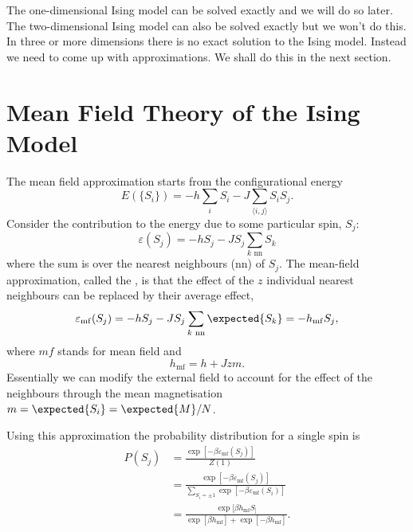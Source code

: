 \documentclass[fleqn]{NotesClass}
\begin{document}
    The one-dimensional Ising model can be solved exactly and we will do so later.
    The two-dimensional Ising model can also be solved exactly but we won't do this.
    In three or more dimensions there is no exact solution to the Ising model.
    Instead we need to come up with approximations.
    We shall do this in the next section.
    
    \section{Mean Field Theory of the Ising Model}
    The mean field approximation starts from the configurational energy
    \begin{equation}
        E(\{S_i\}) = -h\sum_iS_i - J\sum_{\langle i, j \rangle} S_i S_j.
    \end{equation}
    Consider the contribution to the energy due to some particular spin, \(S_j\):
    \begin{equation}
        \varepsilon(S_j) = -hS_j - JS_j\sum_{k\text{ nn}} S_k
    \end{equation}
    where the sum is over the nearest neighbours (nn) of \(S_j\).
    The mean-field approximation, called the , is that the effect of the \(z\) individual nearest neighbours can be replaced by their average effect,
    \begin{equation}
        \varepsilon_{\mathrm{mf}}(S_j) = -hS_j - JS_j \sum_{k\text{ nn}} \expected{S_k} = -h_{\mathrm{mf}}S_j,
    \end{equation}
    where \(mf\) stands for mean field and 
    \begin{equation}
        h_{\mathrm{mf}} = h + Jzm.
    \end{equation}
    Essentially we can modify the external field to account for the effect of the neighbours through the mean magnetisation \(m = \expected{S_i} = \expected{M}/N\).
    
    Using this approximation the probability distribution for a single spin is
    \begin{align}
        P(S_j) &= \frac{\exp[-\beta\varepsilon_{\mathrm{mf}}(S_j)]}{Z(1)}\\
        &= \frac{\exp[-\beta\varepsilon_{\mathrm{mf}}(S_j)]}{\sum_{S_i=\pm 1} \exp[-\beta\varepsilon_{\mathrm{mf}}(S_i)]}\\
        &= \frac{\exp[\beta h_{\mathrm{mf}}S_]}{\exp[\beta h_{\mathrm{mf}}] + \exp[-\beta h_{\mathrm{mf}}]}.
    \end{align}
    
\end{document}
